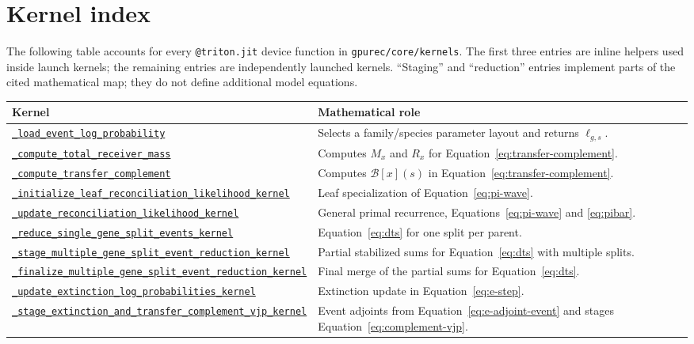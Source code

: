\documentclass[11pt]{article}
\newcommand{\kernelref}[2]{\href{../../gpurec/core/kernels/#1}{\nolinkurl{#2}}}
\begin{document}
\section{Kernel index}
\label{sec:kernel-index}

The following table accounts for every \texttt{@triton.jit} device function in
\texttt{gpurec/core/kernels}.  The first three entries are inline helpers used
inside launch kernels; the remaining entries are independently launched
kernels.  ``Staging'' and ``reduction'' entries implement parts of the cited
mathematical map; they do not define additional model equations.

\small
\begin{longtable}{>{\raggedright\arraybackslash}p{}
                  >{\raggedright\arraybackslash}p{}}
\toprule
Kernel & Mathematical role \\
\midrule
\endhead
\kernelref{pi_forward.py}{_load_event_log_probability} & Selects a family/species parameter layout and returns $\ell_{g,s}$. \\
\kernelref{pi_forward.py}{_compute_total_receiver_mass} & Computes $M_x$ and $R_x$ for Equation~\eqref{eq:transfer-complement}. \\
\kernelref{pi_forward.py}{_compute_transfer_complement} & Computes $\mathcal B[x](s)$ in Equation~\eqref{eq:transfer-complement}. \\
\kernelref{pi_forward.py}{_initialize_leaf_reconciliation_likelihood_kernel} & Leaf specialization of Equation~\eqref{eq:pi-wave}. \\
\kernelref{pi_forward.py}{_update_reconciliation_likelihood_kernel} & General primal recurrence, Equations~\eqref{eq:pi-wave} and \eqref{eq:pibar}. \\
\kernelref{pi_forward.py}{_reduce_single_gene_split_events_kernel} & Equation~\eqref{eq:dts} for one split per parent. \\
\kernelref{pi_forward.py}{_stage_multiple_gene_split_event_reduction_kernel} & Partial stabilized sums for Equation~\eqref{eq:dts} with multiple splits. \\
\kernelref{pi_forward.py}{_finalize_multiple_gene_split_event_reduction_kernel} & Final merge of the partial sums for Equation~\eqref{eq:dts}. \\
\kernelref{e_step.py}{_update_extinction_log_probabilities_kernel} & Extinction update in Equation~\eqref{eq:e-step}. \\
\kernelref{e_step.py}{_stage_extinction_and_transfer_complement_vjp_kernel} & Event adjoints from Equation~\eqref{eq:e-adjoint-event} and stages Equation~\eqref{eq:complement-vjp}. \\

\end{longtable}
\end{document}
